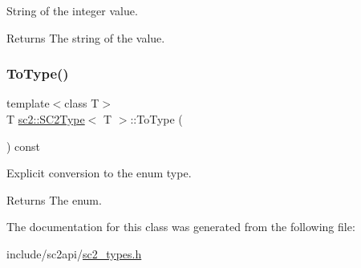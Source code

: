 String of the integer value. \begin{DoxyReturn}{Returns}
The string of the value. 
\end{DoxyReturn}
\mbox{\label{classsc2_1_1_s_c2_type_ada2d70972edaa615780f86165b7e87a3}} 
\subsubsection{\texorpdfstring{To\+Type()}{ToType()}}
{\footnotesize\ttfamily template$<$class T$>$ \\
T \hyperlink{classsc2_1_1_s_c2_type}{sc2\+::\+S\+C2\+Type}$<$ T $>$\+::To\+Type (\begin{DoxyParamCaption}{ }\end{DoxyParamCaption}) const\hspace{0.3cm}{\ttfamily [inline]}}

Explicit conversion to the enum type. \begin{DoxyReturn}{Returns}
The enum. 
\end{DoxyReturn}


The documentation for this class was generated from the following file\+:\begin{DoxyCompactItemize}
\item 
include/sc2api/\hyperlink{sc2__types_8h}{sc2\+\_\+types.\+h}\end{DoxyCompactItemize}

